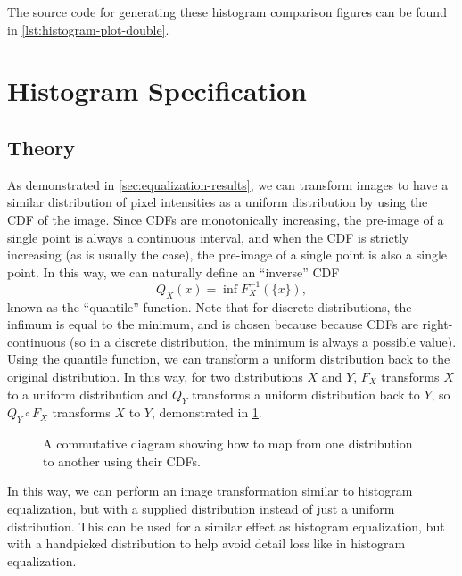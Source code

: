 \documentclass[headings=optiontoheadandtoc,listof=totoc,parskip=full]{scrartcl}
\begin{document}
The source code for generating these histogram comparison figures can be found in \cref{lst:histogram-plot-double}.

\section{Histogram Specification}

\subsection{Theory}
As demonstrated in \cref{sec:equalization-results}, we can transform images to have a similar distribution of pixel intensities as a uniform distribution by using the CDF of the image. Since CDFs are monotonically increasing, the pre-image of a single point is always a continuous interval, and when the CDF is strictly increasing (as is usually the case), the pre-image of a single point is also a single point. In this way, we can naturally define an ``inverse'' CDF
\begin{equation}
	Q_X(x) = \inf F_X^{-1}(\{x\}), \label{eq:quantile-func}
\end{equation}
known as the ``quantile'' function. Note that for discrete distributions, the infimum is equal to the minimum, and is chosen because because CDFs are right-continuous (so in a discrete distribution, the minimum is always a possible value). Using the quantile function, we can transform a uniform distribution back to the original distribution. In this way, for two distributions $X$ and $Y$, $F_X$ transforms $X$ to a uniform distribution and $Q_Y$ transforms a uniform distribution back to $Y$, so $Q_Y \circ F_X$ transforms $X$ to $Y$, demonstrated in  \cref{fig:specification-cd}.

\begin{figure}[H]
	\centering
	\caption{A commutative diagram showing how to map from one distribution to another using their CDFs.}
	\label{fig:specification-cd}
\end{figure}

In this way, we can perform an image transformation similar to histogram equalization, but with a supplied distribution instead of just a uniform distribution. This can be used for a similar effect as histogram equalization, but with a handpicked distribution to help avoid detail loss like in histogram equalization.\par
\end{document}
